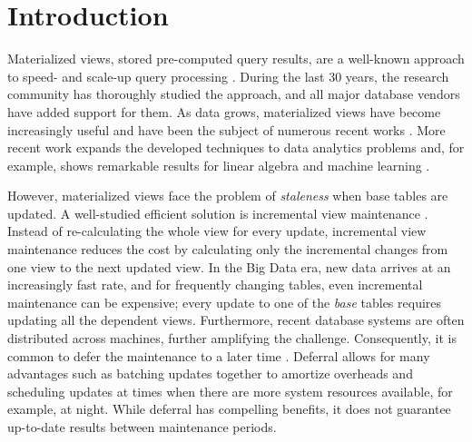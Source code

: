 \section{Introduction}
Materialized views, stored pre-computed query results, are a well-known approach to speed- and scale-up query processing \cite{LarsonY85, gupta1995maintenance, chirkova2011materialized, halevy2001answering}.
During the last 30 years, the research community has thoroughly studied the approach, and all major database vendors have added support for them. 
As data grows, materialized views have become increasingly useful and have been the subject of numerous recent works \cite{lefevre2014opportunistic, bailis2014scalable, perez2014history}.
More recent work expands the developed techniques to data analytics problems and, for example, shows remarkable results for linear algebra and machine learning \cite{nikolic2014linview, zhang2014mat}.

However, materialized views face the problem of \emph{staleness} when base tables are updated. 
A well-studied efficient solution is incremental view maintenance \cite{gupta1995maintenance, chirkova2011materialized}.
Instead of re-calculating the whole view for every update, incremental view maintenance reduces the cost by calculating only the incremental changes from one view to the next updated view. 
In the Big Data era, new data arrives at an increasingly fast rate, and for frequently changing tables, even incremental maintenance can be expensive; every update to one of the {\em base} tables requires updating all the dependent views. 
Furthermore, recent database systems are often distributed across machines, further amplifying the challenge. 
Consequently, it is common to defer the maintenance to a later time \cite{chirkova2011materialized, zhou2007lazy}.
Deferral allows for many advantages such as batching updates together to amortize overheads and scheduling updates at times when there are more system resources available, for example, at night.
While deferral has compelling benefits, it does not guarantee up-to-date results between maintenance periods. 


